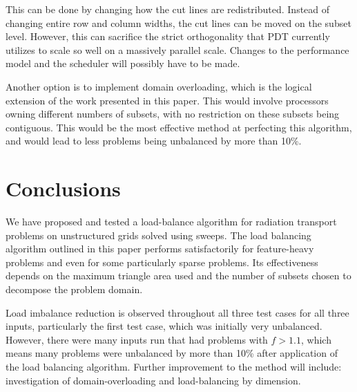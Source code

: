 \documentclass{anstrans}
\begin{document}
This can be done by changing how the cut lines are redistributed. Instead of changing entire row and column widths, the cut lines can be moved on the subset level. However, this can sacrifice the strict orthogonality that PDT currently utilizes to scale so well on a massively parallel scale. Changes to the performance model and the scheduler will possibly have to be made.

Another option is to implement domain overloading, which is the logical extension of the work presented in this paper. This would involve processors owning different numbers of subsets, with no restriction on these subsets being contiguous. This would be the most effective method at perfecting this algorithm, and would lead to less problems being unbalanced by more than 10\%.

\section{Conclusions}

We have proposed and tested a load-balance algorithm for radiation transport problems on unstructured grids solved using sweeps. 
The load balancing algorithm outlined in this paper performs satisfactorily for feature-heavy problems and even for some particularly sparse problems. Its effectiveness depends on the maximum triangle area used and the number of subsets chosen to decompose the problem domain. 

Load imbalance reduction is observed throughout all three test cases for all three inputs, particularly the first test case, which was initially very unbalanced. However, there were many inputs run that had problems with $f > 1.1$, which means many problems were unbalanced by more than 10\% after application of the load balancing algorithm. 
Further improvement to the method will include: investigation of domain-overloading \cite{mpadams2015} and load-balancing by dimension.


\end{document}
